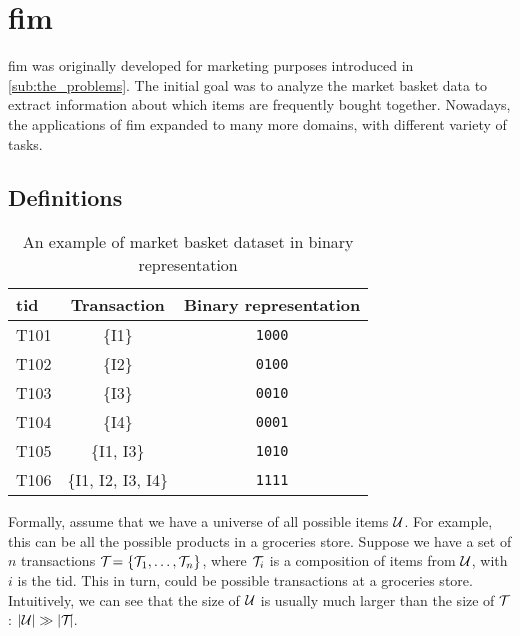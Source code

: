 \section{\Acl{fim}}
\label{sec:fim}
\Acl{fim} was originally developed for marketing purposes introduced in \autoref{sub:the_problems}.
The initial goal was to analyze the market basket data to extract information about which items are frequently bought together.
Nowadays, the applications of \acl{fim} expanded to many more domains, with different variety of tasks.

\subsection{Definitions}
\begin{table}[tb]
    \centering
    \begin{tabular}{|l|c|c|}
        \hline
        \textbf{tid} & \textbf{Transaction} & \textbf{Binary representation} \\ \hline
        T101         & \{I1\}               & \texttt{1000}                  \\ \hline
        T102         & \{I2\}               & \texttt{0100}                  \\ \hline
        T103         & \{I3\}               & \texttt{0010}                  \\ \hline
        T104         & \{I4\}               & \texttt{0001}                  \\ \hline
        T105         & \{I1, I3\}           & \texttt{1010}                  \\ \hline
        T106         & \{I1, I2, I3, I4\}   & \texttt{1111}                  \\ \hline
    \end{tabular}%
    \caption{An example of market basket dataset in binary representation}
    \label{tab:binary-prepresentation}
\end{table}
Formally, assume that we have a universe of all possible items $\mathcal{U}$.
For example, this can be all the possible products in a groceries store.
Suppose we have a set of $\mathit{n}$ transactions $\mathcal{T}_{} = \{\mathcal{T}_{1}, \dots, \mathcal{T}_{n}\}{}$, where $\mathcal{T}_{i}$ is a composition of items from $\mathcal{U}$, with $i$ is the \ac{tid}.
This in turn, could be possible transactions at a groceries store.
Intuitively, we can see that the size of $\mathcal{U}$ is usually much larger than the size of $\mathcal{T}_{}$: $|\mathcal{U}| \gg |\mathcal{T}_{} |$.

